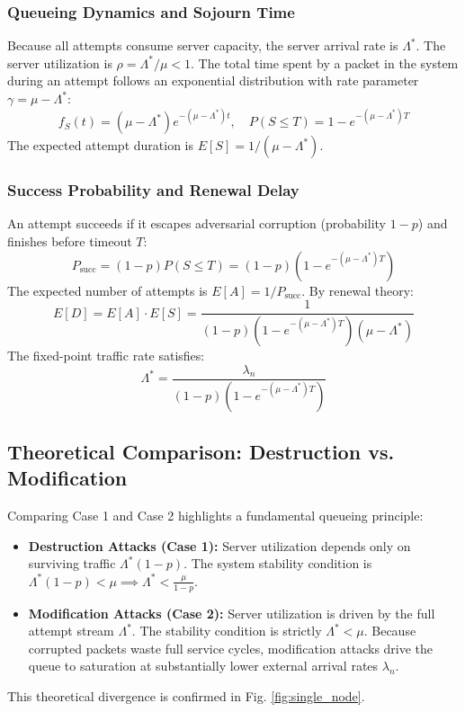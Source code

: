 \documentclass[journal,compsoc]{IEEEtran}
\begin{document}
\subsubsection{Queueing Dynamics and Sojourn Time}
Because all attempts consume server capacity, the server arrival rate is $\Lambda^*$. The server utilization is $\rho = \Lambda^*/\mu < 1$. The total time spent by a packet in the system during an attempt follows an exponential distribution with rate parameter $\gamma = \mu - \Lambda^*$:
\begin{equation}
f_S(t) = (\mu - \Lambda^*) e^{-(\mu - \Lambda^*) t}, \quad P(S \le T) = 1 - e^{-(\mu - \Lambda^*) T}
\end{equation}
The expected attempt duration is $E[S] = 1/(\mu - \Lambda^*)$.

\subsubsection{Success Probability and Renewal Delay}
An attempt succeeds if it escapes adversarial corruption (probability $1 - p$) and finishes before timeout $T$:
\begin{equation}
P_{\text{succ}} = (1 - p) P(S \le T) = (1 - p)\left(1 - e^{-(\mu - \Lambda^*) T}\right)
\end{equation}
The expected number of attempts is $E[A] = 1/P_{\text{succ}}$. By renewal theory:
\begin{equation}
E[D] = E[A] \cdot E[S] = \frac{1}{(1 - p)\left(1 - e^{-(\mu - \Lambda^*) T}\right)(\mu - \Lambda^*)}
\end{equation}
The fixed-point traffic rate satisfies:
\begin{equation}
\Lambda^* = \frac{\lambda_n}{(1 - p)\left(1 - e^{-(\mu - \Lambda^*) T}\right)}
\end{equation}

\subsection{Theoretical Comparison: Destruction vs. Modification}
Comparing Case 1 and Case 2 highlights a fundamental queueing principle:
\begin{itemize}
    \item \textbf{Destruction Attacks (Case 1):} Server utilization depends only on surviving traffic $\Lambda^*(1-p)$. The system stability condition is $\Lambda^*(1-p) < \mu \implies \Lambda^* < \frac{\mu}{1-p}$.
    \item \textbf{Modification Attacks (Case 2):} Server utilization is driven by the full attempt stream $\Lambda^*$. The stability condition is strictly $\Lambda^* < \mu$. Because corrupted packets waste full service cycles, modification attacks drive the queue to saturation at substantially lower external arrival rates $\lambda_n$.
\end{itemize}
This theoretical divergence is confirmed in Fig. \ref{fig:single_node}.
\end{document}
